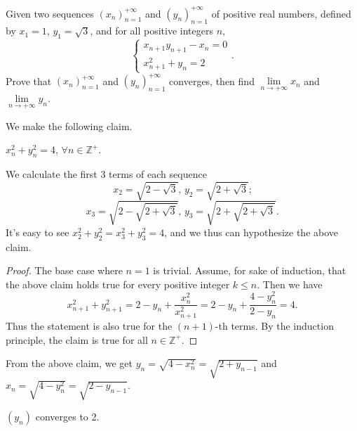 \documentclass[11pt]{article}
\begin{document}
        \begin{problem}
            Given two sequences \((x_n)_{n=1}^{+\infty}\) and \((y_n)_{n=1}^{+\infty}\) of positive real numbers, defined by \(x_1 = 1\), \(y_1 = \sqrt{3}\), and for all positive integers \(n\),
            \[\begin{cases}
                x_{n+1}y_{n+1} - x_n = 0 \\
                x_{n+1}^2 + y_n = 2
            \end{cases}.\]
            Prove that \((x_n)_{n=1}^{+\infty}\) and \((y_n)_{n=1}^{+\infty}\) converges, then find \(\lim\limits_{n \to +\infty} x_n\) and \(\lim\limits_{n \to +\infty} y_n\).
        \end{problem}

        \begin{solution}
            We make the following claim.
            
            \begin{claim}
                \(x_n^2 + y_n^2 = 4\), \(\forall n \in \mathbb{Z}^+\).
            \end{claim}
            
            \begin{motivation}
                We calculate the first 3 terms of each sequence
                \[x_2 = \sqrt{2 - \sqrt{3}} \text{, } y_2 = \sqrt{2 + \sqrt{3}} \text{;}\]
                \[x_3 = \sqrt{2 - \sqrt{2 + \sqrt{3}}} \text{, } y_3 = \sqrt{2 + \sqrt{2 + \sqrt{3}}}.\]
                It's easy to see \(x_2^2 + y_2^2 = x_3^2 + y_3^2 = 4\), and we thus can hypothesize the above claim.
            \end{motivation}

            \begin{proof}
                The base case where \(n = 1\) is trivial. Assume, for sake of induction, that the above claim holds true for every positive integer \(k \leq n\). Then we have
                \[x_{n+1}^2 + y_{n+1}^2 = 2 - y_n + \frac{x_n^2}{x_{n+1}^2} = 2 - y_n + \frac{4 - y_n^2}{2 - y_n} = 4.\]
                Thus the statement is also true for the \((n + 1)\)-th terms. By the induction principle, the claim is true for all \(n \in \mathbb{Z}^+\).
            \end{proof}

            From the above claim, we get \(y_n = \sqrt{4 - x_n^2} = \sqrt{2 + y_{n-1}}\) and \(x_n = \sqrt{4 - y_n^2} = \sqrt{2 - {y_{n-1}}}\).

            \begin{claim}
                \((y_n)\) converges to 2.
            \end{claim}


\end{solution}
\end{document}
